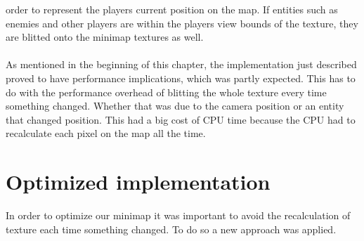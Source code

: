 order to represent the players current position on the map. If entities such as
enemies and other players are within the players view bounds of the
texture, they are blitted onto the minimap textures as well. 
\\
\\
As mentioned in the beginning of this chapter, the implementation just
described proved to have performance implications, which was partly expected. 
This has to do with the performance overhead of blitting the whole texture every time something changed.
Whether that was due to the camera position or an entity that changed position.
This had a big cost of CPU time because the CPU had to recalculate each pixel on the map all the time.


\section{Optimized implementation}
In order to optimize our minimap it was important to avoid the recalculation of texture each time something changed.
To do so a new approach was applied.

